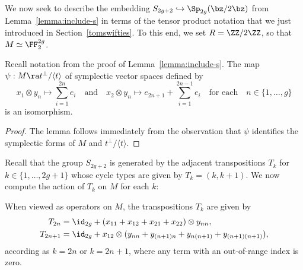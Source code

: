 We now seek to describe the embedding $S_{2g+2} \hookrightarrow \Sp_{2g}(\bz / 2 \bz)$ from Lemma~\ref{lemma:include-s} in terms of the tensor product notation that we just introduced in Section~\ref{tomswifties}. To this end, we set $R = \ZZ/2\ZZ$, so that $M \simeq \FF_2^{2g}$.
\begin{lemma} \label{lemma:basis} 
	Recall notation from the proof of Lemma~\ref{lemma:include-s}. The map $\psi: M \ra t^\perp / \langle t \rangle$ of symplectic vector spaces defined by
	\[ x_1 \otimes y_n \mapsto \sum_{i=1}^{2n} e_i \quad \text{and} \quad
	x_2 \otimes y_n \mapsto e_{2n+1} + \sum_{i=1}^{2n-1} e_i \quad \text{for each} \quad n \in \{1, \dots, g\}
	\] 
    is an isomorphism.
\end{lemma} 
\begin{proof}
The lemma follows immediately from the observation that $\psi$ identifies the symplectic forms of $M$ and $t^\perp / \langle t \rangle$.
\end{proof}
Recall that the group $S_{2g+2}$ is generated by the adjacent transpositions $T_k$ for $k \in \{1, \dots, 2g+1\}$ whose cycle types are given by $T_k = (k, k+1)$. We now compute the action of $T_k$ on $M$ for each $k$: 
\begin{lemma} \label{lemma:s-action}
	When viewed as operators on $M$, the transpositions $T_k$ are given by
	\begin{align*} 
	T_{2n} &= \id_{2g} + (x_{11} + x_{12} + x_{21} + x_{22}) \otimes y_{nn}, \\
	T_{2n+1} &= \id_{2g} + x_{12} \otimes (y_{nn} + y_{(n+1) n} + y_{n (n+1)} + y_{(n+1) (n+1)}), 
	\end{align*}
	according as $k = 2n$ or $k = 2n+1$, where any term with an out-of-range index is zero. 
\end{lemma} 
